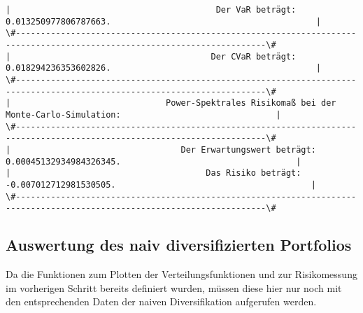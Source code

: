 \documentclass[paper=landscape]{scrartcl}
\begin{document}
\begin{Verbatim}[commandchars=\\\{\}]
|                                         Der VaR beträgt: 0.013250977806787663.                                         | 
\#------------------------------------------------------------------------------------------------------------------------\#
|                                        Der CVaR beträgt: 0.018294236353602826.                                         | 
\#------------------------------------------------------------------------------------------------------------------------\#
|                               Power-Spektrales Risikomaß bei der Monte-Carlo-Simulation:                               | 
\#------------------------------------------------------------------------------------------------------------------------\#
|                                  Der Erwartungswert beträgt: 0.00045132934984326345.                                   | 
|                                       Das Risiko beträgt: -0.007012712981530505.                                       | 
\#------------------------------------------------------------------------------------------------------------------------\#

    \end{Verbatim}

    \hypertarget{auswertung-des-naiv-diversifizierten-portfolios}{%
\subsection{Auswertung des naiv diversifizierten
Portfolios}\label{auswertung-des-naiv-diversifizierten-portfolios}}

Da die Funktionen zum Plotten der Verteilungsfunktionen und zur
Risikomessung im vorherigen Schritt bereits definiert wurden, müssen
diese hier nur noch mit den entsprechenden Daten der naiven
Diversifikation aufgerufen werden.
\end{document}

